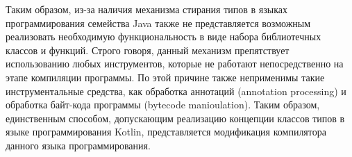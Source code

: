 Таким образом, из-за наличия механизма стирания типов в языках программирования семейства Java также не представляется возможным реализовать необходимую функциональность в виде набора библиотечных классов и функций. Строго говоря, данный механизм препятствует использованию любых инструментов, которые не работают непосредственно на этапе компиляции программы. По этой причине также неприменимы такие инструментальные средства, как обработка аннотаций (annotation processing) и обработка байт-кода программы (bytecode manioulation). Таким образом, единственным способом, допускающим реализацию концепции классов типов в языке программирования Kotlin, представляется модификация компилятора данного языка программирования. 